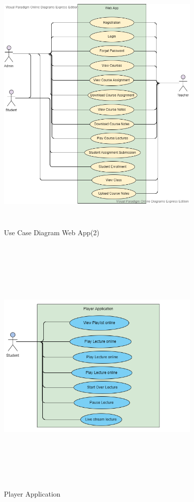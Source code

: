 \documentclass[12pt]{article}
\begin{document}
\newpage
\mbox\\
\mbox\\
\begin{figure}[h]
\begin{center}
\includegraphics[width=10cm, height=13cm]{DBMUseCaseWebAppPart2}
\caption{Use Case Diagram Web App(2)}
\end{center}
\end{figure}


\newpage
\begin{figure}[h]
\begin{center}
\includegraphics[width=10cm, height=13cm]{PlayerApplication}
\caption{Player Application}
\end{center}
\end{figure}
\end{document}
